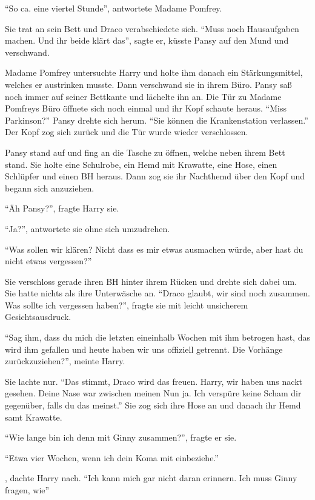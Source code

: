 \enquote{So ca. eine viertel Stunde}, antwortete Madame Pomfrey.

Sie trat an sein Bett und Draco verabschiedete sich. \enquote{Muss noch Hausaufgaben machen. Und ihr beide klärt das}, sagte er, küsste Pansy auf den Mund und verschwand.

Madame Pomfrey untersuchte Harry und holte ihm danach ein Stärkungsmittel, welches er austrinken musste. Dann verschwand sie in ihrem Büro. Pansy saß noch immer auf seiner Bettkante und lächelte ihn an. Die Tür zu Madame Pomfreys Büro öffnete sich noch einmal und ihr Kopf schaute heraus. \enquote{Miss Parkinson?} Pansy drehte sich herum. \enquote{Sie können die Krankenstation verlassen.} Der Kopf zog sich zurück und die Tür wurde wieder verschlossen.

Pansy stand auf und fing an die Tasche zu öffnen, welche neben ihrem Bett stand. Sie holte eine Schulrobe, ein Hemd mit Krawatte, eine Hose, einen Schlüpfer und einen BH heraus. Dann zog sie ihr Nachthemd über den Kopf und begann sich anzuziehen.

\enquote{Äh Pansy?}, fragte Harry sie.

\enquote{Ja?}, antwortete sie ohne sich umzudrehen.

\enquote{Was sollen wir klären? Nicht dass es mir etwas ausmachen würde, aber hast du nicht etwas vergessen?}

Sie verschloss gerade ihren BH hinter ihrem Rücken und drehte sich dabei um. Sie hatte nichts als ihre Unterwäsche an. \enquote{Draco glaubt, wir sind noch zusammen. \gst Was sollte ich vergessen haben?}, fragte sie mit leicht unsicherem Gesichtsausdruck.

\enquote{Sag ihm, dass du mich die letzten eineinhalb Wochen mit ihm betrogen hast, das wird ihm gefallen und heute haben wir uns offiziell getrennt. \gst Die Vorhänge zurückzuziehen?}, meinte Harry.

Sie lachte nur. \enquote{Das stimmt, Draco wird das freuen. \gst Harry, wir haben uns nackt gesehen. Deine Nase war zwischen meinen \gst Nun ja. Ich verspüre keine Scham dir gegenüber, falls du das meinst.} Sie zog sich ihre Hose an und danach ihr Hemd samt Krawatte.

\enquote{Wie lange bin ich denn mit Ginny zusammen?}, fragte er sie.

\enquote{Etwa vier Wochen, wenn ich dein Koma mit einbeziehe.}

, dachte Harry nach. \enquote{Ich kann mich gar nicht daran erinnern. Ich muss Ginny fragen, wie\abs}

